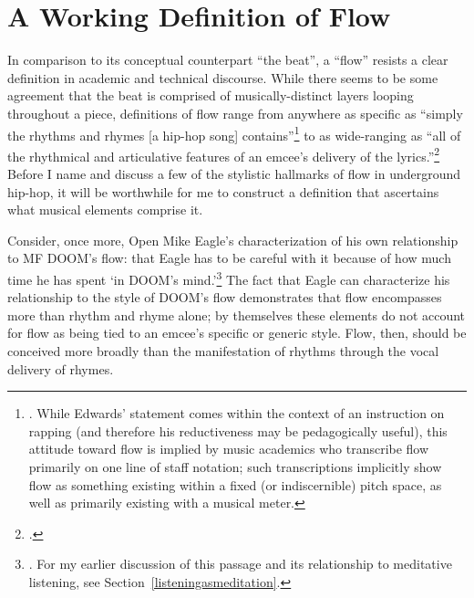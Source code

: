 \onehalfspacing
\section{A Working Definition of Flow}
In comparison to its conceptual counterpart ``the beat'', a ``flow'' resists a clear definition in
academic and technical discourse. While there seems to be some agreement that the beat is comprised
of musically-distinct layers looping throughout a piece, definitions of flow range from anywhere as
specific as ``simply the rhythms and rhymes [a hip-hop song] contains''\footnote{
    \autocite[63]{pauledwardsHowRapArt2009}. While Edwards' statement comes within the context of an
    instruction on rapping (and therefore his reductiveness may be pedagogically useful), this attitude
    toward flow is implied by music academics who transcribe flow primarily on one line of staff notation;
    such transcriptions implicitly show flow as something existing within a fixed (or indiscernible) pitch
    space, as well as primarily existing with a musical meter.} 
to as wide-ranging as ``all of the rhythmical and articulative features of an emcee's delivery of 
the lyrics.''\footnote{
    \cite{kyleadamsMetricalTechniquesFlow2009}.} 
Before I name and discuss a few of the stylistic hallmarks of flow in underground hip-hop, it will be
worthwhile for me to construct a definition that ascertains what musical elements comprise it.

Consider, once more, Open Mike Eagle's characterization of his own relationship to MF DOOM's flow:
that Eagle has to be careful with it because of how much time he has spent `in DOOM's mind.'\footnote{
    \cite{estellecaswellRappingDeconstructedBest2016}. For my earlier discussion of this passage and its
    relationship to meditative listening, see Section~\ref{listeningasmeditation}.} 
The fact that Eagle can characterize his relationship to the style of DOOM's flow demonstrates that
flow encompasses more than rhythm and rhyme alone; by themselves these elements do not account for flow
as being tied to an emcee's specific or generic style. Flow, then, should be conceived more broadly than
the manifestation of rhythms through the vocal delivery of rhymes.

